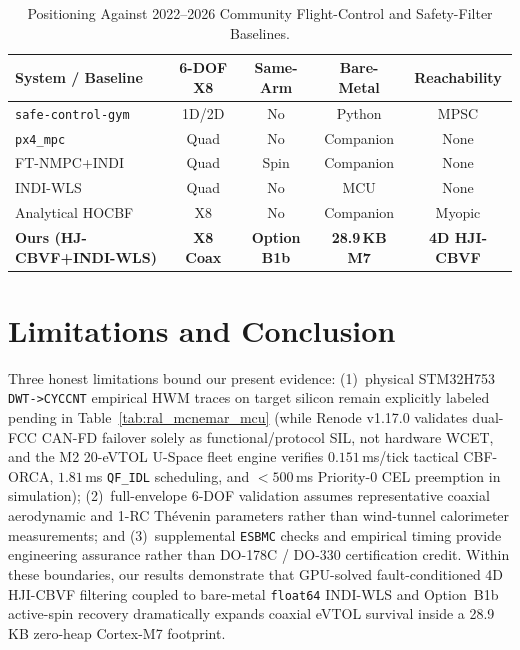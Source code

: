 \documentclass[letterpaper, 10 pt, journal, twoside]{IEEEtran}
\begin{document}
\begin{table}[t]
\centering
\caption{Positioning Against 2022--2026 Community Flight-Control and Safety-Filter Baselines.}
\label{tab:ral_sota_positioning}
\scriptsize
\begin{tabular}{@{}lcccc@{}}
\toprule
\textbf{System / Baseline} & \textbf{6-DOF X8} & \textbf{Same-Arm} & \textbf{Bare-Metal} & \textbf{Reachability} \\
\midrule
\texttt{safe-control-gym}~\cite{yuan_safecontrolgym_2022} & 1D/2D & No & Python & MPSC \\
\texttt{px4\_mpc}~\cite{lim_px4_mpc_2024} & Quad & No & Companion & None \\
FT-NMPC+INDI~\cite{nan_ftc_nmpc_indi_2022} & Quad & Spin & Companion & None \\
INDI-WLS~\cite{smeur_indi_wls_2017} & Quad & No & MCU & None \\
Analytical HOCBF~\cite{ames_cbf_2019} & X8 & No & Companion & Myopic \\
\textbf{Ours (HJ-CBVF+INDI-WLS)} & \textbf{X8 Coax} & \textbf{Option B1b} & \textbf{28.9\,KB M7} & \textbf{4D HJI-CBVF} \\
\bottomrule
\end{tabular}
\end{table}

\section{Limitations and Conclusion}
\label{sec:conclusion}

Three honest limitations bound our present evidence: (1)~physical STM32H753 \texttt{DWT->CYCCNT} empirical HWM traces on target silicon remain explicitly labeled pending in Table~\ref{tab:ral_mcnemar_mcu} (while Renode v1.17.0 validates dual-FCC CAN-FD failover solely as functional/protocol SIL, not hardware WCET, and the M2 20-eVTOL U-Space fleet engine verifies $0.151$\,ms/tick tactical CBF-ORCA, $1.81$\,ms \texttt{QF\_IDL} scheduling, and $<500$\,ms Priority-0 CEL preemption in simulation); (2)~full-envelope 6-DOF validation assumes representative coaxial aerodynamic and 1-RC Th\'evenin parameters rather than wind-tunnel calorimeter measurements; and (3)~supplemental \texttt{ESBMC} checks and empirical timing provide engineering assurance rather than DO-178C / DO-330 certification credit. Within these boundaries, our results demonstrate that GPU-solved fault-conditioned 4D HJI-CBVF filtering coupled to bare-metal \texttt{float64} INDI-WLS and Option~B1b active-spin recovery dramatically expands coaxial eVTOL survival inside a 28.9\,KB zero-heap Cortex-M7 footprint.



\end{document}
